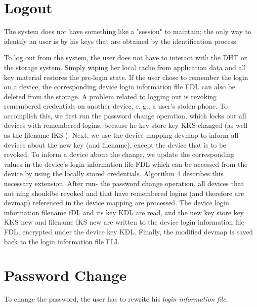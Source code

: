 \section{Logout}
The system does not have something like a "session" to maintain; the only way
to identify an user is by his keys that are obtained by the identification
process.

 To log out from the system, the user does not have to interact
with the DHT or the storage system. Simply wiping her local
cache from application data and all key material restores the
pre-login state. If the user chose to remember the login on a
device, the corresponding device login information file FDL
can also be deleted from the storage.
 A problem related to logging out is revoking remembered
credentials on another device, e. g., a user’s stolen phone. To
accomplish this, we first run the password change operation,
which locks out all devices with remembered logins, because
he key store key KKS changed (as well as the filename fKS ).
Next, we use the device mapping devmap to inform all devices
about the new key (and filename), except the device that is to
be revoked. To inform a device about the change, we update
the corresponding values in the device’s login information file
 FDL which can be accessed from the device by using the
locally stored credentials.
 Algorithm 4 describes this necessary extension. After run- the password change
operation, all devices that not ning shouldbe revoked and that have remembered
logins (and therefore are devmap) referenced in the device mapping are
processed. The device login information filename fDL and its key KDL are read,
and the new key store key KKS new and filename fKS new are written to the
device login information file FDL, encrypted under the device key KDL.
Finally, the modified devmap is saved back to the login information file FLI.
 



\section{Password Change}
To change the password, the user has to rewrite his \textit{login information
file}.


